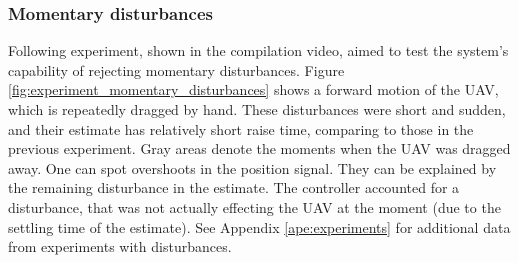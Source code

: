\subsubsection{Momentary disturbances}
\label{cap:momentary_disturbances}

Following experiment, shown in the compilation video, aimed to test the system's capability of rejecting momentary disturbances. Figure \ref{fig:experiment_momentary_disturbances} shows a forward motion of the UAV, which is repeatedly dragged by hand. These disturbances were short and sudden, and their estimate has relatively short raise time, comparing to those in the previous experiment. Gray areas denote the moments when the UAV was dragged away. One can spot overshoots in the position signal. They can be explained by the remaining disturbance in the estimate. The controller accounted for a disturbance, that was not actually effecting the UAV at the moment (due to the settling time of the estimate). See Appendix \ref{ape:experiments} for additional data from experiments with disturbances.

